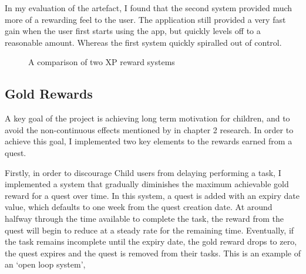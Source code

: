 In my evaluation of the artefact, I found that the second system provided much more of a rewarding feel to the user. 
The application still provided a very fast gain when the user first starts using the app, but quickly levels off to a reasonable amount.
Whereas the first system quickly spiralled out of control.

\begin{figure}
\centering
{}
\caption{A comparison of two XP reward systems}
\label{fig:xprewardcomparison}
\end{figure}

\subsection{Gold Rewards}
A key goal of the project is achieving long term motivation for children, and to avoid the non-continuous effects mentioned by \cite{deci2001extrinsic} in chapter 2 research.
In order to achieve this goal, I implemented two key elements to the rewards earned from a quest.

Firstly, in order to discourage Child users from delaying performing a task, I implemented a system that gradually diminishes the maximum achievable gold reward for a quest over time. 
In this system, a quest is added with an expiry date value, which defaults to one week from the quest creation date.
At around halfway through the time available to complete the task, the reward from the quest will begin to reduce at a steady rate for the remaining time.
Eventually, if the task remains incomplete until the expiry date, the gold reward drops to zero, the quest expires and the quest is removed from their tasks.
This is an example of an `open loop system', 

